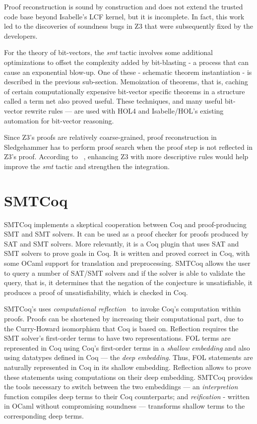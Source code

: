\documentclass{article}
\begin{document}
		Proof reconstruction is sound by construction 
		and does not extend the trusted code base
		beyond Isabelle's LCF kernel, but it is 
		incomplete. In fact, this work led to the 
		discoveries of soundness bugs in Z3 that were subsequently fixed by the developers.
		
		For the theory of bit-vectors, the \textit{smt}
		tactic involves some additional optimizations 
		to offset the complexity added by bit-blasting - 
		a process that can cause an exponential blow-up. 
		One of these - schematic theorem instantiation - 
		is described in the previous sub-section. 
		Memoization of theorems, that is, caching of 
		certain computationally expensive bit-vector 
		specific theorems in a structure called a term net 
		also proved useful. These techniques, and many 
		useful bit-vector rewrite rules --- are used 
		with HOL4 and Isabelle/HOL's existing automation
		for bit-vector reasoning.
		
		Since Z3's proofs are relatively coarse-grained,
		proof reconstruction in Sledgehammer has to perform
		proof search when the proof step is not reflected 
		in Z3's proof. According to 
		~\cite{DBLP:phd/dnb/Bohme12}, enhancing Z3 with 
		more descriptive rules would 
		help improve the \textit{smt} tactic and strengthen 
		the integration.
		
\section{SMTCoq}
\label{sec:cert}
	SMTCoq implements a skeptical cooperation between 
	Coq and proof-producing SMT  and SMT solvers. 
	It can be used as a proof checker for proofs 
	produced by SAT and SMT solvers. More relevantly, 
	it is a Coq plugin that uses SAT and SMT solvers to 
	prove goals in Coq. It is written and proved 
	correct in Coq, with some OCaml support for 
	translation and preprocessing. SMTCoq allows 
	the user to query a number of SAT/SMT solvers 
	and if the solver is able to validate the query, 
	that is, it determines that the negation of the 
	conjecture is unsatisfiable, it produces a proof 
	of unsatisfiability, which is checked in Coq.
	
	SMTCoq's uses \textit{computational reflection}~\cite{113737} 
	to invoke Coq's computation within 
	proofs. Proofs can be shortened by increasing 
	their computational	part, due to the 
	Curry-Howard isomorphism that Coq is based on. 
	Reflection requires the SMT solver's first-order
	terms to have two representations. FOL terms are 
	represented in Coq using Coq's first-order 
	terms in a \textit{shallow embedding} and also 
	using datatypes defined in Coq --- the 
	\textit{deep embedding}. Thus, FOL statements 
	are naturally represented in Coq in its 
	shallow embedding. Reflection allows to 
	prove these statements using computations 
	on their deep embedding. SMTCoq provides 
	the tools necessary to switch between the 
	two embeddings --- an \textit{interpretion} 
	function compiles deep terms to their Coq 
	counterparts; and \textit{reification} 
	- written in OCaml without compromising 
	soundness --- transforms shallow terms to the 
	corresponding deep terms.
	
\end{document}
